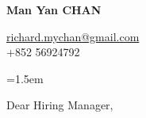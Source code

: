 \documentclass[11pt, a4paper]{article}
\begin{document}
\noindent %
{\Huge\bfseries Man Yan CHAN} %
\hfill %
\begin{minipage}[t]{0.5\linewidth} %
    \raggedleft %
    \href{mailto:richard.mychan@gmail.com}{richard.mychan@gmail.com} \\
    +852 56924792 \\
\end{minipage}

\vspace{2\baselineskip} %

\noindent %

\bigskipamount=1.5em %
\bigskip %

%

\noindent Dear Hiring Manager, %
\end{document}
